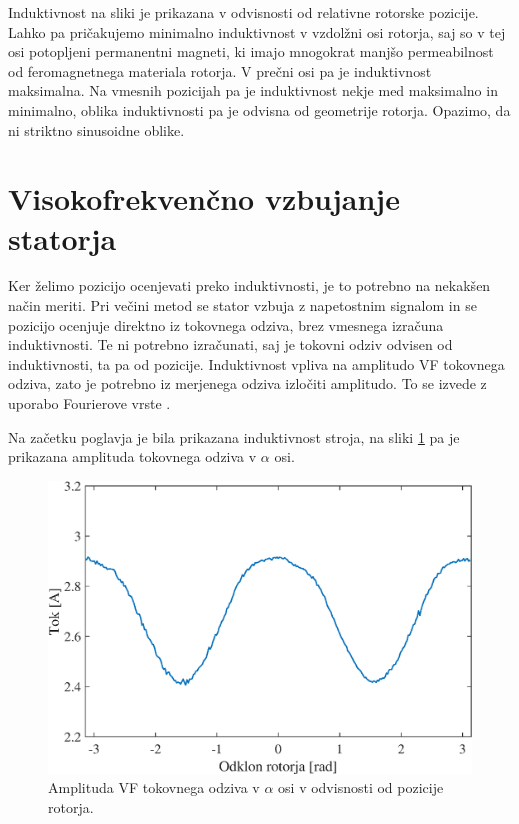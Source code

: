 \documentclass[a4paper,twoside,openright,12pt,slovene]{book}
\begin{document}
Induktivnost na sliki je prikazana v odvisnosti od relativne rotorske pozicije. Lahko pa pričakujemo minimalno induktivnost v vzdolžni osi rotorja, saj so v tej osi potopljeni permanentni magneti, ki
imajo mnogokrat manjšo permeabilnost od feromagnetnega materiala rotorja. V prečni osi pa je induktivnost maksimalna. Na vmesnih pozicijah pa je induktivnost nekje med maksimalno in minimalno, oblika
induktivnosti pa je odvisna od geometrije rotorja. Opazimo, da ni striktno sinusoidne oblike.




\section{Visokofrekvenčno vzbujanje statorja}

Ker želimo pozicijo ocenjevati preko induktivnosti, je to potrebno na nekakšen način meriti. Pri večini metod se stator vzbuja z napetostnim signalom in se pozicijo ocenjuje direktno iz tokovnega
odziva, brez vmesnega izračuna induktivnosti. Te ni potrebno izračunati, saj je tokovni odziv odvisen od induktivnosti, ta pa od pozicije. Induktivnost vpliva na amplitudo VF tokovnega odziva, zato je
potrebno iz merjenega odziva izločiti amplitudo. To se izvede z uporabo Fourierove vrste \cite{enwiki:fourierSeries}.

Na začetku poglavja je bila prikazana induktivnost stroja, na sliki \ref{tokovniOdzivAlpha} pa je prikazana amplituda tokovnega odziva v $\alpha$ osi. 

\begin{figure}[!htbp]
    \centering
    \includegraphics[width=0.9\columnwidth]{Slike/tokovniOdzivAlpha.eps}
    \caption{\label{tokovniOdzivAlpha} Amplituda VF tokovnega odziva v $\alpha$ osi v odvisnosti od pozicije rotorja.}
\end{figure}
\end{document}
